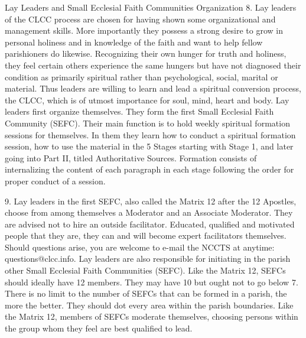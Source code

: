 \documentclass[oneside]{book}
\begin{document}
Lay Leaders and Small Ecclesial Faith Communities Organization 8. Lay leaders of
the CLCC process are chosen for having shown some organizational and management
skills. More importantly they possess a strong desire to grow in personal
holiness and in knowledge of the faith and want to help fellow parishioners do
likewise. Recognizing their own hunger for truth and holiness, they feel certain
others experience the same hungers but have not diagnosed their condition as
primarily spiritual rather than psychological, social, marital or material. Thus
leaders are willing to learn and lead a spiritual conversion process, the CLCC,
which is of utmost importance for soul, mind, heart and body.  Lay leaders first
organize themselves. They form the first Small Ecclesial Faith Community
(SEFC). Their main function is to hold weekly spiritual formation sessions for
themselves. In them they learn how to conduct a spiritual formation session, how
to use the material in the 5 Stages starting with Stage 1, and later going into
Part II, titled Authoritative Sources. Formation consists of internalizing the
content of each paragraph in each stage following the order for proper conduct
of a session.

9. Lay leaders in the first SEFC, also called the Matrix 12 after the 12
Apostles, choose from among themselves a Moderator and an Associate
Moderator. They are advised not to hire an outside facilitator. Educated,
qualified and motivated people that they are, they can and will become expert
facilitators themselves. Should questions arise, you are welcome to e-mail the
NCCTS at anytime: questions@clcc.info.  Lay leaders are also responsible for
initiating in the parish other Small Ecclesial Faith Communities (SEFC). Like
the Matrix 12, SEFCs should ideally have 12 members. They may have 10 but ought
not to go below 7. There is no limit to the number of SEFCs that can be formed
in a parish, the more the better. They should dot every area within the parish
boundaries. Like the Matrix 12, members of SEFCs moderate themselves, choosing
persons within the group whom they feel are best qualified to lead.
\end{document}
